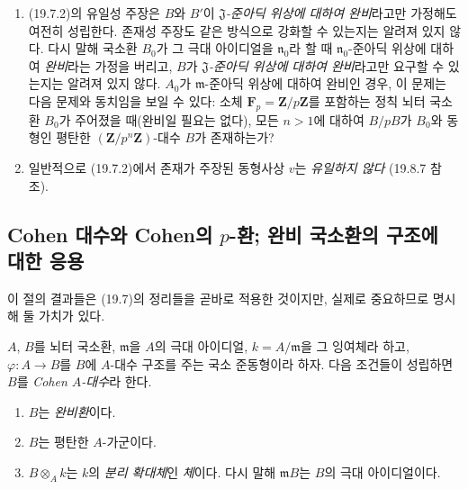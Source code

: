\begin{remarks}[19.7.3]
\label{0.19.7.3-ko}
\begin{enumerate}
  \item[(i)] (19.7.2)의 유일성 주장은 $B$와 $B'$이
  \emph{$\mathfrak J$-준아딕 위상에 대하여 완비}라고만 가정해도
  여전히 성립한다. 존재성 주장도 같은 방식으로 강화할 수 있는지는
  알려져 있지 않다. 다시 말해 국소환 $B_0$가 그 극대 아이디얼을
  $\mathfrak n_0$라 할 때 $\mathfrak n_0$-준아딕 위상에 대하여
  \emph{완비}라는 가정을 버리고, $B$가
  \emph{$\mathfrak J$-준아딕 위상에 대하여 완비}라고만 요구할 수
  있는지는 알려져 있지 않다. $A_0$가 $\mathfrak m$-준아딕 위상에
  대하여 완비인 경우, 이 문제는 다음 문제와 동치임을 보일 수 있다:
  소체 $\mathbf F_p=\mathbf Z/p\mathbf Z$를 포함하는 정칙 뇌터
  국소환 $B_0$가 주어졌을 때(완비일 필요는 없다), 모든 $n>1$에
  대하여 $B/pB$가 $B_0$와 동형인 평탄한
  $(\mathbf Z/p^n\mathbf Z)$-대수 $B$가 존재하는가?
  \item[(ii)] 일반적으로 (19.7.2)에서 존재가 주장된 동형사상 $v$는
  \emph{유일하지 않다} (19.8.7 참조).
\end{enumerate}
\end{remarks}

\subsection{Cohen 대수와 Cohen의 $p$-환; 완비 국소환의 구조에 대한 응용}
\label{subsection:0.19.8-ko}

이 절의 결과들은 (19.7)의 정리들을 곧바로 적용한 것이지만, 실제로
중요하므로 명시해 둘 가치가 있다.

\begin{definition}[19.8.1]
\label{0.19.8.1-ko}
$A$, $B$를 뇌터 국소환, $\mathfrak m$을 $A$의 극대 아이디얼,
$k=A/\mathfrak m$을 그 잉여체라 하고, $\varphi:A\to B$를 $B$에
$A$-대수 구조를 주는 국소 준동형이라 하자. 다음 조건들이 성립하면
$B$를 \emph{Cohen $A$-대수}라 한다.
\begin{enumerate}
  \item[(i)] $B$는 \emph{완비환}이다.
  \item[(ii)] $B$는 평탄한 $A$-가군이다.
  \item[(iii)] $B\otimes_A k$는 $k$의 \emph{분리 확대체}인
  \emph{체}이다. 다시 말해 $\mathfrak mB$는 $B$의 극대
  아이디얼이다.
\end{enumerate}
\end{definition}



